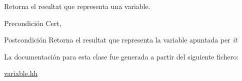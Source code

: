 Retorna el resultat que representa una variable. 

\begin{DoxyPrecond}{Precondición}
Cert, 
\end{DoxyPrecond}
\begin{DoxyPostcond}{Postcondición}
Retorna el resultat que representa la variable apuntada per {\itshape it} 
\end{DoxyPostcond}


La documentación para esta clase fue generada a partir del siguiente fichero\+:\begin{DoxyCompactItemize}
\item 
\hyperlink{variable_8hh}{variable.\+hh}\end{DoxyCompactItemize}
